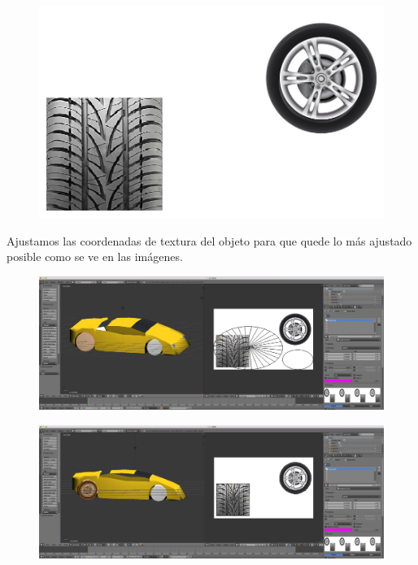 \documentclass[10pt]{article}
\begin{document}
\begin{figure}[H]
	\begin{center}
	 		\includegraphics[width = 1.00\textwidth]{Imagenes/p3-img20}
	\end{center} 
\end{figure}

Ajustamos las coordenadas de textura del objeto para que quede lo más ajustado posible como se ve en las imágenes. \\

\begin{figure}[H]
	\begin{center}
	 		\includegraphics[width = 1.00\textwidth]{Imagenes/p3-img21}
	\end{center} 
\end{figure}

\begin{figure}[H]
	\begin{center}
	 		\includegraphics[width = 1.00\textwidth]{Imagenes/p3-img22}
	\end{center} 
\end{figure}
\end{document}
